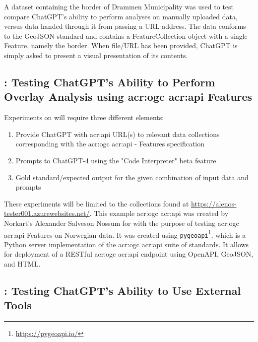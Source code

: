 A dataset containing the border of Drammen Municipality was used to test compare ChatGPT's ability to perform analyses on manually uploaded data, versus data handed through it from passing a URL address. The data conforms to the GeoJSON standard and contains a FeatureCollection object with a single Feature, namely the border. When file/URL has been provided, ChatGPT is simply asked to present a visual presentation of its contents.

\subsection[RQ2: Testing ChatGPT's Ability to Perform Overlay Analysis using OGC API Features]{: Testing ChatGPT's Ability to Perform Overlay Analysis using \acrshort{acr:ogc} \acrshort{acr:api} Features}

Experiments on  will require three different elements:

\begin{enumerate}
    \item Provide ChatGPT with \acrshort{acr:api} URL(s) to relevant data collections corresponding with the \acrshort{acr:ogc} \acrshort{acr:api} - Features specification
    \item Prompts to ChatGPT-4 using the "Code Interpreter" beta feature
    \item Gold standard/expected output for the given combination of input data and prompts
\end{enumerate}

These experiments will be limited to the collections found at \url{https://alenos-tester001.azurewebsites.net/}. This example \acrshort{acr:ogc} \acrshort{acr:api} was created by Norkart's Alexander Salveson Nossum for with the purpose of testing \acrshort{acr:ogc} \acrshort{acr:api} Features on Norwegian data. It was created using \texttt{pygeoapi}\footnote{\url{https://pygeoapi.io/}}, which is a Python server implementation of the \acrshort{acr:ogc} \acrshort{acr:api} suite of standards. It allows for deployment of a RESTful \acrshort{acr:ogc} \acrshort{acr:api} endpoint using OpenAPI, GeoJSON, and HTML.

\subsection[RQ3: Testing ChatGPT's Ability to To Use External Tools]{: Testing ChatGPT's Ability to Use External Tools}

